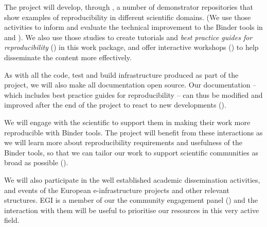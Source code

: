 \begin{workpackage}[id=education,wphases=0-36!1.14,
  title={Dissemination, education and engagement},
  short=Education,
  lead=IFR,
  IFRRM=16,
  MPRM=6,
  SRLRM=7,
  QSRM=3,
  UIORM=9,
  swsites
]
\begin{wpdescription}

  The \TheProject project will develop, through , a number
  of demonstrator repositories that show examples of reproducibility in
  different scientific domains. (We use
  those activities to inform and evaluate the technical improvement to the
  Binder tools in  and ). We also use those
  studies to create tutorials and \emph{best practice guides for
    reproducibility} () in this work package, and
  offer interactive workshops () to help disseminate the
  content more effectively.

  As with all the code, test and build infrastructure produced as part of the
  project, we will also make all documentation open source. Our documentation --
  which includes best practice guides for reproducibility -- can thus be
  modified and improved after the end of the project to react to new
  developments ().

  We will engage with the scientific to support them in making their
  work more reproducible with Binder tools. The project will benefit from these interactions
  as we will learn more about reproducibility requirements and usefulness of the
  Binder tools, so that we can tailor our work to support scientific communities as broad as possible
  ().

  We will also participate in the well established academic dissemination
  activities, and events of the European e-infrastructure projects and other
  relevant structures. EGI is a member of our the community engagement panel
  () and the interaction with
  them will be useful to prioritise our resources in this very active field.


\end{wpdescription}
\end{workpackage}
